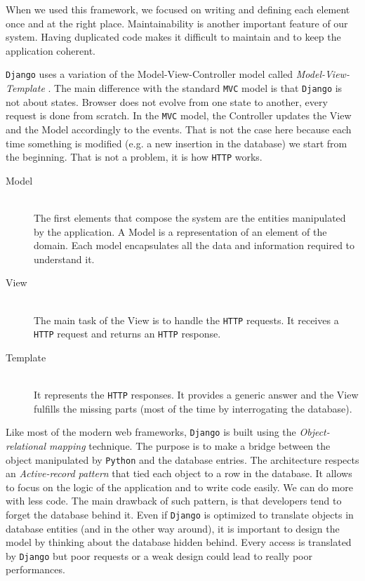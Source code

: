 When we used this framework, we focused on writing and defining each element once and at the right place. Maintainability is another important feature of our system. Having duplicated code makes it difficult to maintain and to keep the application coherent.

\texttt{Django} uses a variation of the Model-View-Controller model called \emph{Model-View-Template} \cite{mvt}. The main difference with the standard \texttt{MVC} model is that \texttt{Django} is not about states. Browser does not evolve from one state to another, every request is done from scratch. In the \texttt{MVC} model, the Controller updates the View and the Model accordingly to the events. That is not the case here because each time something is modified (e.g. a new insertion in the database) we start from the beginning. That is not a problem, it is how \texttt{HTTP} works.

\begin{description}
\item[Model] \hfill \\
The first elements that compose the system are the entities manipulated by the application. A Model is a representation of an element of the domain. Each model encapsulates all the data and information required to understand it.

\item[View] \hfill \\
The main task of the View is to handle the \texttt{HTTP} requests. It receives a \texttt{HTTP} request and returns an \texttt{HTTP} response.

\item[Template] \hfill \\
It represents the \texttt{HTTP} responses. It provides a generic answer and the View fulfills the missing parts (most of the time by interrogating the database).
\end{description}

Like most of the modern web frameworks, \texttt{Django} is built using the \emph{Object-relational mapping} technique. The purpose is to make a bridge between the object manipulated by \texttt{Python} and the database entries. The architecture respects an \emph{Active-record pattern} that tied each object to a row in the database. It allows to focus on the logic of the application and to write code easily. We can do more with less code. The main drawback of such pattern, is that developers tend to forget the database behind it. Even if \texttt{Django} is optimized to translate objects in database entities (and in the other way around), it is important to design the model by thinking about the database hidden behind. Every access is translated by \texttt{Django} but poor requests or a weak design could lead to really poor performances.

